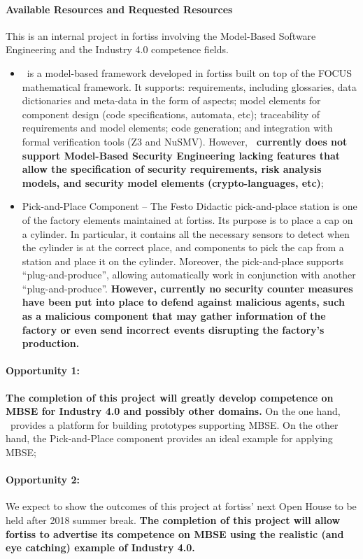 \paragraph{Available Resources and Requested Resources} 
This is an internal project in fortiss involving the Model-Based Software Engineering and the Industry 4.0 competence fields. 
\begin{itemize}
  \item \autofocus\ is a model-based framework developed in fortiss built on top of the FOCUS mathematical framework. It supports: requirements, including glossaries, data dictionaries and meta-data in the form of aspects; model elements for component design (code specifications, automata, etc); traceability of requirements and model elements; code generation; and integration with formal verification tools (Z3 and NuSMV). However, \textbf{\autofocus\ currently does not support Model-Based Security Engineering lacking features that allow the specification of security requirements, risk analysis models, and security model elements (crypto-languages, etc)};


  \item Pick-and-Place Component -- The Festo Didactic pick-and-place station is one of the factory elements maintained at fortiss. Its purpose is to place a cap on a cylinder. In particular, it contains all the necessary sensors to detect when the cylinder is at the correct place, and components to pick the cap from a station and place it on the cylinder. Moreover, the pick-and-place supports ``plug-and-produce'', allowing automatically work in conjunction with another ``plug-and-produce''. \textbf{However, currently no security counter measures have been put into place to defend against malicious agents, such as a malicious component that may gather information of the factory or even send incorrect events disrupting the factory's production.}
\end{itemize}

\paragraph{Opportunity 1:} \textbf{The completion of this project will greatly develop competence on MBSE for Industry 4.0 and possibly other domains.}  On the one hand, \autofocus\ provides a platform for building prototypes supporting MBSE. On the other hand, the Pick-and-Place component provides an ideal example for applying MBSE;

\paragraph{Opportunity 2:} We expect to show the outcomes of this project at fortiss' next Open House to be held after 2018 summer break. \textbf{The completion of this project will allow fortiss to advertise its competence on MBSE using the realistic (and eye catching) example of Industry 4.0.}

